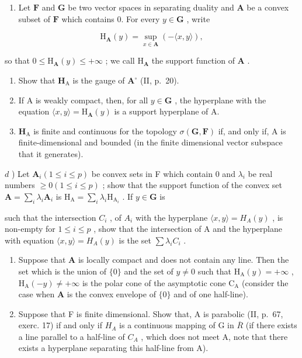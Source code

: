 \begin{enumerate}
\def\labelenumi{\arabic{enumi})}
\setcounter{enumi}{8}
\tightlist
\item
  Let \(\mathbf{F}\) and \(\mathbf{G}\) be two vector spaces in separating duality and \(\mathbf{A}\) be a convex subset of \(\mathbf{F}\) which contains 0. For every \(y \in \mathbf{G}\) , write
\end{enumerate}

\[
\mathrm{H} _ {\mathbf {A}} (y) = \sup _ {x \in \mathbf {A}} (- \langle x, y \rangle),
\]

so that \(0 \leqslant \mathrm{H}_{\mathbf{A}}(y) \leqslant +\infty\) ; we call \(\mathrm{H}_{\mathbf{A}}\) the support function of \(\mathbf{A}\) .

\begin{enumerate}
\def\labelenumi{\alph{enumi})}
\item
  Show that \(\mathbf{H}_{\mathrm{A}}\) is the gauge of \(\mathbf{A}^{\circ}\) (II, p.~20).
\item
  If A is weakly compact, then, for all \(y \in \mathbf{G}\) , the hyperplane with the equation \(\langle x, y \rangle = \mathrm{H}_{\mathbf{A}}(y)\) is a support hyperplane of A.
\item
  \(\mathbf{H}_{\mathrm{A}}\) is finite and continuous for the topology \(\sigma (\mathbf{G},\mathbf{F})\) if, and only if, A is finite-dimensional and bounded (in the finite dimensional vector subspace that it generates).
\end{enumerate}

\(d\) ) Let \(\mathbf{A}_i(1\leqslant i\leqslant p)\) be convex sets in F which contain 0 and \(\lambda_{i}\) be real numbers \(\geqslant 0(1\leqslant i\leqslant p)\) ; show that the support function of the convex set \(\mathbf{A} = \sum_{i}\lambda_{i}\mathbf{A}_{i}\) is \(\mathrm{H}_{\mathrm{A}} = \sum_{i}\lambda_{i}\mathrm{H}_{\mathrm{A}_{i}}\) . If \(y\in \mathbf{G}\) is

such that the intersection \(C_{i}\) , of \(A_{i}\) with the hyperplane \(\langle x, y \rangle = H_{A}(y)\) , is non-empty for \(1 \leqslant i \leqslant p\) , show that the intersection of A and the hyperplane with equation \(\langle x, y \rangle = H_{A}(y)\) is the set \(\sum \lambda_{i}C_{i}\) .

\begin{enumerate}
\def\labelenumi{\alph{enumi})}
\setcounter{enumi}{4}
\item
  Suppose that \(\mathbf{A}\) is locally compact and does not contain any line. Then the set which is the union of \(\{0\}\) and the set of \(y \neq 0\) such that \(\mathrm{H}_{\mathrm{A}}(y) = +\infty\) , \(\mathrm{H}_{\mathrm{A}}(-y) \neq +\infty\) is the polar cone of the asymptotic cone \(\mathrm{C}_{\mathrm{A}}\) (consider the case when \(\mathbf{A}\) is the convex envelope of \(\{0\}\) and of one half-line).
\item
  Suppose that F is finite dimensional. Show that, A is parabolic (II, p.~67, exerc. 17) if and only if \(H_{A}\) is a continuous mapping of G in \(\overline{R}\) (if there exists a line parallel to a half-line of \(C_{A}\) , which does not meet A, note that there exists a hyperplane separating this half-line from A).
\end{enumerate}

